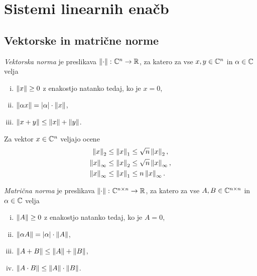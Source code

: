 \section{Sistemi linearnih enačb}

\subsection{Vektorske in matrične norme}

\begin{definicija}
\emph{Vektorska norma} je preslikava
$\left\lVert \cdot\right\rVert \colon \mathbb{C}^n \to \mathbb{R}$, za katero za vse $x, y \in \mathbb{C}^n$
in $\alpha \in \mathbb{C}$ velja

\begin{enumerate}[i)]
\item $\left\lVert x\right\rVert \geq 0$ z enakostjo natanko tedaj, ko je $x = 0$,
\item $\left\lVert \alpha x\right\rVert = \left\lvert \alpha\right\rvert \cdot \left\lVert x\right\rVert$,
\item $\left\lVert x+y\right\rVert \leq \left\lVert x\right\rVert + \left\lVert y\right\rVert$.
\end{enumerate}
\end{definicija}

\begin{trditev}
Za vektor $x \in \mathbb{C}^n$ veljajo ocene
\begin{align*}
\left\lVert x\right\rVert_2 &\leq \left\lVert x\right\rVert_1 \leq \sqrt{n} \left\lVert x\right\rVert_2,
\\
\left\lVert x\right\rVert_\infty &\leq \left\lVert x\right\rVert_2 \leq \sqrt{n} \left\lVert x\right\rVert_\infty,
\\
\left\lVert x\right\rVert_\infty &\leq \left\lVert x\right\rVert_1 \leq n \left\lVert x\right\rVert_\infty.
\end{align*}
\end{trditev}

\begin{definicija}
\emph{Matrična norma} je preslikava
$\left\lVert \cdot\right\rVert \colon \mathbb{C}^{n \times n} \to \mathbb{R}$, za katero za vse
$A, B \in \mathbb{C}^{n \times n}$ in $\alpha \in \mathbb{C}$ velja

\begin{enumerate}[i)]
\item $\left\lVert A\right\rVert \geq 0$ z enakostjo natanko tedaj, ko je $A = 0$,
\item $\left\lVert \alpha A\right\rVert = \left\lvert \alpha\right\rvert \cdot \left\lVert A\right\rVert$,
\item $\left\lVert A+B\right\rVert \leq \left\lVert A\right\rVert + \left\lVert B\right\rVert$,
\item $\left\lVert A \cdot B\right\rVert \leq \left\lVert A\right\rVert \cdot \left\lVert B\right\rVert$.
\end{enumerate}
\end{definicija}

